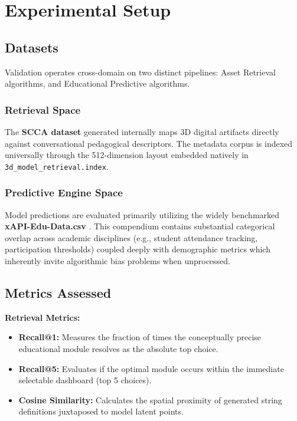 \documentclass[conference]{IEEEtran}
\begin{document}
\section{Experimental Setup}

\subsection{Datasets}

Validation operates cross-domain on two distinct pipelines: Asset Retrieval algorithms, and Educational Predictive algorithms.

\subsubsection{Retrieval Space} 
The \textbf{SCCA dataset} generated internally maps 3D digital artifacts directly against conversational pedagogical descriptors. The metadata corpus is indexed universally through the 512-dimension layout embedded natively in \texttt{3d\_model\_retrieval.index}.

\subsubsection{Predictive Engine Space}
Model predictions are evaluated primarily utilizing the widely benchmarked \textbf{xAPI-Edu-Data.csv} \cite{miller2021predictive}. This compendium contains substantial categorical overlap across academic disciplines (e.g., student attendance tracking, participation thresholds) coupled deeply with demographic metrics which inherently invite algorithmic bias problems when unprocessed.

\subsection{Metrics Assessed}

\textbf{Retrieval Metrics:}
\begin{itemize}
    \item \textbf{Recall@1:} Measures the fraction of times the conceptually precise educational module resolves as the absolute top choice.
    \item \textbf{Recall@5:} Evaluates if the optimal module occurs within the immediate selectable dashboard (top 5 choices).
    \item \textbf{Cosine Similarity:} Calculates the spatial proximity of generated string definitions juxtaposed to model latent points.
\end{itemize}
\end{document}
